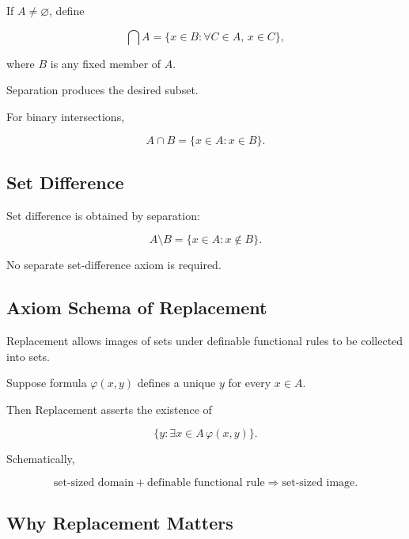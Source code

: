 If \(A\neq\varnothing\), define

\[
\boxed{
\bigcap A
=
\{
x\in B:
\forall C\in A,\,
x\in C
\},
}
\]

where \(B\) is any fixed member of \(A\).

Separation produces the desired subset.

For binary intersections,

\[
\boxed{
A\cap B
=
\{
x\in A:x\in B
\}.
}
\]

\subsection{Set Difference}
\label{subsec:axiomatic-set-difference}

Set difference is obtained by separation:

\[
\boxed{
A\setminus B
=
\{
x\in A:x\notin B
\}.
}
\]

No separate set-difference axiom is required.

\subsection{Axiom Schema of Replacement}
\label{subsec:replacement-schema}

Replacement allows images of sets under definable functional rules to be
collected into sets.

Suppose formula \(\varphi(x,y)\) defines a unique \(y\) for every \(x\in A\).

Then Replacement asserts the existence of

\[
\boxed{
\{
y:
\exists x\in A\,\varphi(x,y)
\}.
}
\]

Schematically,

\[
\boxed{
\text{set-sized domain}
+
\text{definable functional rule}
\Longrightarrow
\text{set-sized image}.
}
\]

\subsection{Why Replacement Matters}
\label{subsec:why-replacement-matters}

